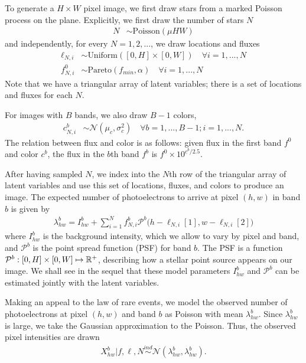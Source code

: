 To generate a $H \times W$ pixel image, we first draw stars from a marked Poisson process
on the plane. Explicitly, we first draw the number of stars $N$
\begin{align}
	N &\sim \text{Poisson}(\mu HW)
\end{align}
and independently, for every $N = 1, 2, ... $, we draw locations and fluxes
\begin{align}
  \ell_{N, i} &\sim \text{Uniform}([0, H] \times [0, W]) \quad \forall i = 1, ..., N \\
  f_{N, i}^{0} & \sim \text{Pareto}(f_{min}, \alpha) \quad \forall i = 1, ..., N
  \label{eq:flux_prior}
\end{align}
Note that we have a triangular array of latent variables; there is a set of
locations and fluxes for each $N$.

For images with $B$ bands, we also draw $B - 1$ colors,
\begin{align}
  c_{N, i}^{b}  & \sim \mathcal{N}(\mu_c, \sigma^2_c) \quad \forall b = 1, ..., B - 1; i = 1, ..., N.
\end{align}
The relation between flux and color is as follows: 
given flux in the first band $f^0$ and color $c^b$, 
the flux in the $b$th band $f^b$ is $f^0 \times 10^{c^b / 2.5}$.

After having sampled $N$,
we index into the $N$th row of the triangular array of latent variables
and use this set of locations, fluxes, and colors to produce an image.
The expected number of photoelectrons to arrive at pixel $(h,w)$ in band $b$ is given by
\begin{align}
  \lambda^b_{hw} = I^{b}_{hw} + \sum_{i = 1}^N f_{N, i}^b \mathcal{P}^b\big(h - \ell_{N, i}[1], w - \ell_{N,i}[2]\big)
  \label{eq:expected_intensity}
\end{align}
where $I^{b}_{hw}$ is the background intensity, which we allow to vary by pixel and band,
and $\mathcal{P}^b$ is the point spread function (PSF) for band $b$. The PSF
is a function $\mathcal{P}^b : [0, H] \times [0, W] \mapsto \mathbb{R}^+$,
describing how a stellar point source appears
on our image. We shall see in the sequel that these model
parameters $I^{b}_{hw}$ and $\mathcal{P}^b$ can be estimated jointly with
the latent variables.

Making an appeal to the law of rare events, we model the
observed number of photoelectrons at pixel $(h,w)$ and band $b$ as Poisson
with mean $\lambda^b_{hw}$. Since $\lambda^b_{hw}$ is large,
we take the Gaussian approximation to the Poisson.
Thus, the observed pixel intensities are drawn
\begin{align}
  X_{hw}^b | f, \ell, N \overset{ind}{\sim} \mathcal{N}(\lambda^b_{hw}, \lambda^b_{hw}).
\end{align}

